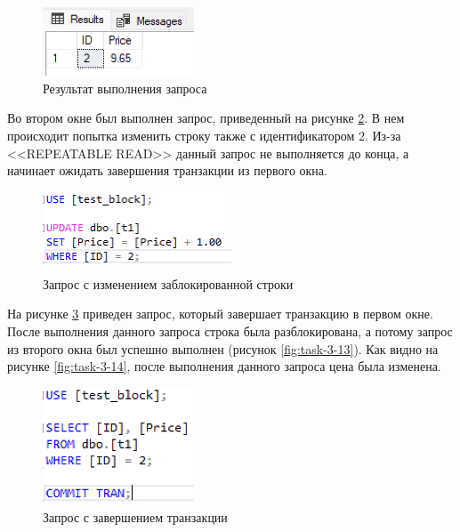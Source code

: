 \documentclass[a4paper, 14pt]{extarticle}
\begin{document}
\begin{figure}[H]
  \centering
  \includegraphics[width=0.4\textwidth]{images/task-3/10.png}
  \caption{Результат выполнения запроса}
  \label{fig:task-3-10}
\end{figure}

Во втором окне был выполнен запрос, приведенный на рисунке \ref{fig:task-3-11}.
В нем происходит попытка изменить строку также с идентификатором 2. Из-за
<<\foreignlanguage{english}{REPEATABLE READ}>> данный запрос не выполняется до
конца, а начинает ожидать завершения транзакции из первого окна.

\begin{figure}[H]
  \centering
  \includegraphics[width=0.5\textwidth]{images/task-3/11.png}
  \caption{Запрос с изменением заблокированной строки}
  \label{fig:task-3-11}
\end{figure}

На рисунке \ref{fig:task-3-12} приведен запрос, который завершает транзакцию в
первом окне. После выполнения данного запроса строка была разблокирована, а
потому запрос из второго окна был успешно выполнен (рисунок
\ref{fig:task-3-13}). Как видно на рисунке \ref{fig:task-3-14}, после выполнения
данного запроса цена была изменена.

\begin{figure}[H]
  \centering
  \includegraphics[width=0.4\textwidth]{images/task-3/12.png}
  \caption{Запрос с завершением транзакции}
  \label{fig:task-3-12}
\end{figure}
\end{document}
